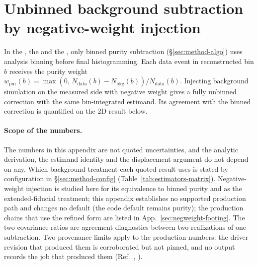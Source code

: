 \section{Unbinned background subtraction by negative-weight injection}
\label{app:negweight}

In the \estPurity{}, the \estExact{} and the \estDetPurity{}, only binned purity subtraction (\S\ref{sec:method-algo}) uses analysis binning before final histogramming. Each data event in reconstructed bin $b$ receives the purity weight $w_{\mathrm{pur}}(b)=\max(0,\,N_{\mathrm{data}}(b)-N_{\mathrm{bkg}}(b))/ N_{\mathrm{data}}(b)$. Injecting background simulation on the measured side with negative weight gives a fully unbinned correction with the same bin-integrated estimand. Its agreement with the binned correction is quantified on the 2D result below.

\paragraph{Scope of the numbers.} The numbers in this appendix are not quoted uncertainties, and the analytic derivation, the estimand identity and the displacement argument do not depend on any. Which background treatment each quoted result uses is stated by configuration in \S\ref{sec:method-config} (Table~\ref{tab:estimators-matrix}). Negative-weight injection is studied here for its equivalence to binned purity and as the extended-fiducial treatment; this appendix establishes no supported production path and changes no default (the code default remains purity); the production chains that use the refined form are listed in App.~\ref{sec:negweight-footing}. The two covariance ratios are agreement diagnostics between two realizations of one subtraction. Two provenance limits apply to the production numbers: the driver revision that produced them is corroborated but not pinned, and no output records the job that produced them (Ref.~\cite{NoteRecords2026}, ).

